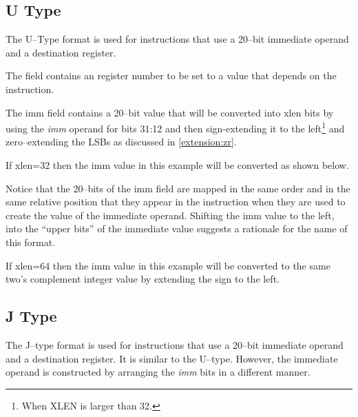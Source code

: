 \subsection{U Type}
\label{insnformat:utype}

The U--Type format is used for instructions that use a 20--bit immediate operand 
and a destination register.
 

The  field contains an  register number to be set to a value that
depends on the instruction.

The imm field 
contains a 20--bit value that will be converted into \Gls{xlen} bits by 
using the {\em imm} operand for bits 31:12 and then sign-extending it 
to the left\footnote{When XLEN is larger than 32.} and zero--extending 
the LSBs as discussed in \autoref{extension:zr}.

If \Gls{xlen}=32 then the imm value in this example will be
converted as shown below.


Notice that the 20--bits of the imm field are mapped in the same order and 
in the same relative position that they appear in the instruction when 
they are used to create the value of the immediate operand.  
Shifting the imm value to the left, into the ``upper bits'' of the immediate 
value suggests a rationale for the name of this format.


If \Gls{xlen}=64 then the imm value in this example will be converted to the
same two's complement integer value by extending the sign to the left.


\subsection{J Type}
\label{insnformat:jtype}

The J--type format is used for instructions that use a 20--bit immediate operand
and a destination register.  It is similar to the U--type.  However, the immediate
operand is constructed by arranging the {\em imm} bits in a different manner.

